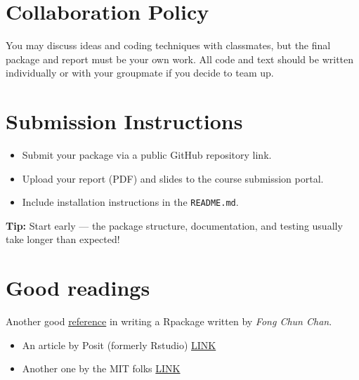 \documentclass[
  letterpaper,
  DIV=11,
  numbers=noendperiod]{scrreprt}
\providecommand{\tightlist}{%
  \setlength{\itemsep}{0pt}\setlength{\parskip}{0pt}}
\begin{document}
\section{Collaboration Policy}\label{collaboration-policy}

You may discuss ideas and coding techniques with classmates, but the
final package and report must be your own work. All code and text should
be written individually or with your groupmate if you decide to team up.

\section{Submission Instructions}\label{submission-instructions}

\begin{itemize}
\tightlist
\item
  Submit your package via a public GitHub repository link.
\item
  Upload your report (PDF) and slides to the course submission portal.
\item
  Include installation instructions in the \texttt{README.md}.
\end{itemize}

\begin{tcolorbox}[enhanced jigsaw, bottomtitle=1mm, colbacktitle=quarto-callout-tip-color!10!white, breakable, arc=.35mm, leftrule=.75mm, left=2mm, toptitle=1mm, colframe=quarto-callout-tip-color-frame, opacityback=0, colback=white, coltitle=black, rightrule=.15mm, titlerule=0mm, title=\textcolor{quarto-callout-tip-color}{\faLightbulb}\hspace{0.5em}{Tip}, toprule=.15mm, opacitybacktitle=0.6, bottomrule=.15mm]

\textbf{Tip:} Start early --- the package structure, documentation, and
testing usually take longer than expected!

\end{tcolorbox}

\section{Good readings}\label{good-readings}

Another good
\href{\%5Bhttps://tinyheero.github.io/jekyll/update/2015/07/26/making-your-first-R-package.html\%5D}{reference}
in writing a Rpackage written by \emph{Fong Chun Chan}.

\begin{itemize}
\item
  An article by Posit (formerly Rstudio)
  \href{https://docs.posit.co/ide/user/ide/guide/pkg-devel/writing-packages.html}{LINK}
\item
  Another one by the MIT folks
  \href{https://web.mit.edu/insong/www/pdf/rpackage_instructions.pdf}{LINK}
\end{itemize}
\end{document}
